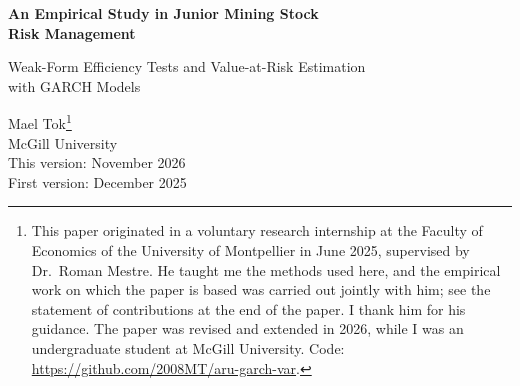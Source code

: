 \documentclass[11pt,a4paper]{article}
\begin{document}
\hypersetup{pageanchor=false}
\begin{titlepage}
\vspace*{1.2cm}
\begin{center}
{\LARGE\bfseries An Empirical Study in Junior Mining Stock\\[4pt] Risk Management\par}
\vspace{0.45cm}
{\Large Weak-Form Efficiency Tests and Value-at-Risk Estimation\\[2pt] with GARCH Models\par}
\vspace{1.1cm}
{\large Mael Tok\footnote{This paper originated in a voluntary research internship at the Faculty of Economics of the University of Montpellier in June 2025, supervised by Dr.\ Roman Mestre. He taught me the methods used here, and the empirical work on which the paper is based was carried out jointly with him; see the statement of contributions at the end of the paper. I thank him for his guidance. The paper was revised and extended in 2026, while I was an undergraduate student at McGill University. Code: \url{https://github.com/2008MT/aru-garch-var}.}}\\[4pt]
{\normalsize McGill University}\\[0.9cm]
{\normalsize This version: November 2026\\ First version: December 2025}
\end{center}
\vspace{1.0cm}


\end{titlepage}
\end{document}
